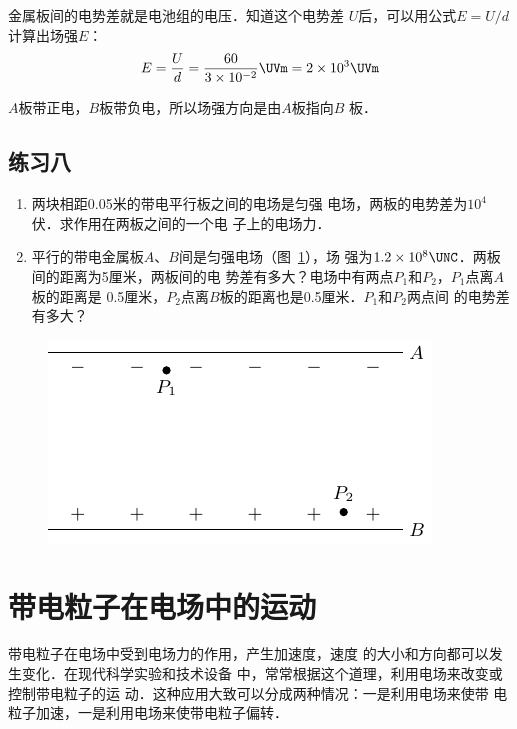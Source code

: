 \begin{solution}
    金属板间的电势差就是电池组的电压．知道这个电势差
$U$后，可以用公式$E=U/d$计算出场强$E$：
\[E=\frac{U}{d}=\frac{60}{3\times 10^{-2}} \UVm=2\times 10^3 \UVm \]

$A$板带正电，$B$板带负电，所以场强方向是由$A$板指向$B$
板．
\end{solution}

\subsection*{练习八}

\begin{enumerate}
    \item 两块相距0.05米的带电平行板之间的电场是匀强
    电场，两板的电势差为$10^4$伏．求作用在两板之间的一个电
    子上的电场力．
    \item 平行的带电金属板$A$、$B$间是匀强电场（图~\ref{fig_B_6-26}），场
    强为$1.2\times10^8\UNC$．两板间的距离为5厘米，两板间的电
    势差有多大？电场中有两点$P_1$和$P_2$，$P_1$点离$A$板的距离是
    0.5厘米，$P_2$点离$B$板的距离也是0.5厘米．$P_1$和$P_2$两点间
    的电势差有多大？
\end{enumerate}

\begin{figure}[htbp]
    \centering
    \includegraphics{fig/B/6-26.pdf}
    \caption{}\label{fig_B_6-26}
\end{figure}    

\section{带电粒子在电场中的运动}

带电粒子在电场中受到电场力的作用，产生加速度，速度
的大小和方向都可以发生变化．在现代科学实验和技术设备
中，常常根据这个道理，利用电场来改变或控制带电粒子的运
动．这种应用大致可以分成两种情况：一是利用电场来使带
电粒子加速，一是利用电场来使带电粒子偏转．

